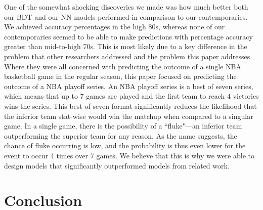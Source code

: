 \documentclass[letterpaper]{article} %
\begin{document}
One of the somewhat shocking discoveries we made was how much better both our BDT and our NN models performed in comparison to our contemporaries. We achieved accuracy percentages in the high 80s, whereas none of our contemporaries seemed to be able to make predictions with percentage accuracy greater than mid-to-high 70s. This is most likely due to a key difference in the problem that other researchers addressed and the problem this paper addresses. Where they were all concerned with predicting the outcome of a single NBA basketball game in the regular season, this paper focused on predicting the outcome of a NBA playoff series. An NBA playoff series is a best of seven series, which means that up to 7 games are played and the first team to reach 4 victories wins the series. This best of seven format significantly reduces the likelihood that the inferior team stat-wise would win the matchup when compared to a singular game. In a single game, there is the possibility of a ``fluke"---an inferior team outperforming the superior team for any reason. As the name suggests, the chance of fluke occurring is low, and the probability is thus even lower for the event to occur 4 times over 7 games. We believe that this is why we were able to design models that significantly outperformed models from related work.


\section{Conclusion}
\end{document}
